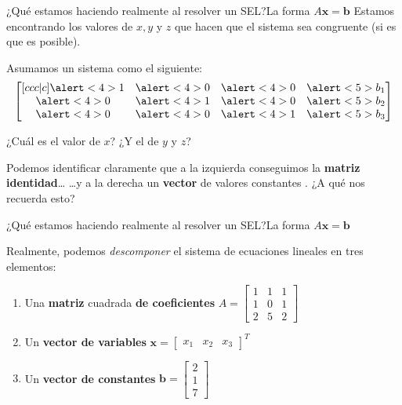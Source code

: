 \documentclass[spanish, c]{beamer}
\begin{document}
\begin{frame}{¿Qué estamos haciendo realmente al resolver un SEL?}{La forma $A\mathbf{x} = \mathbf{b}$}
    Estamos encontrando los valores de $x, y$ y $z$ que hacen que el sistema sea congruente (si es que es posible). \pause

    Asumamos un sistema como el siguiente:
    $$
    \begin{bmatrix}[ccc|c]
        \alert<4>{1} & \alert<4>{0} & \alert<4>{0} & \alert<5>{b_1} \\
        \alert<4>{0} & \alert<4>{1} & \alert<4>{0} & \alert<5>{b_2} \\
        \alert<4>{0} & \alert<4>{0} & \alert<4>{1} & \alert<5>{b_3}
    \end{bmatrix}
    $$ \pause

    ¿Cuál es el valor de $x$? ¿Y el de $y$ y $z$? \pause

    Podemos identificar claramente que a la izquierda conseguimos la \textbf{matriz identidad}\dots \pause
    \dots y a la derecha un \textbf{vector} de valores constantes \pause. ¿A qué nos recuerda esto?
\end{frame}

\begin{frame}{¿Qué estamos haciendo realmente al resolver un SEL?}{La forma $A\mathbf{x} = \mathbf{b}$}
    
    Realmente, podemos \textit{descomponer} el sistema de ecuaciones lineales en tres elementos: \pause

    \bigskip

    \begin{enumerate}[<+->]
        \item Una \textbf{matriz} cuadrada \textbf{de coeficientes} $A = \begin{bmatrix} 1 & 1 & 1 \\ 1 & 0 & 1 \\ 2 & 5 & 2 \end{bmatrix}$
        \item Un \textbf{vector de variables} $\mathbf{x} = \begin{bmatrix}
            x_1 &  x_2 &  x_3\end{bmatrix}^T$
        \item Un \textbf{vector de constantes} $\mathbf{b} = \begin{bmatrix} 2 \\ 1 \\ 7 \end{bmatrix}$
    \end{enumerate}
\end{frame}
\end{document}
